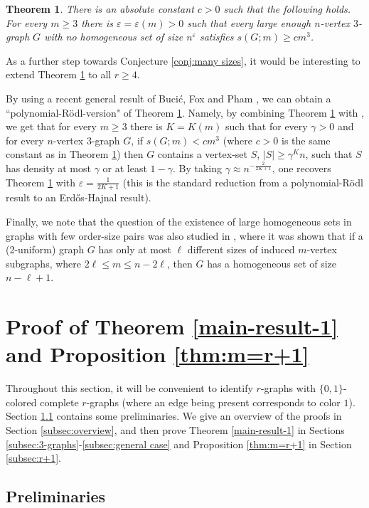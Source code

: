 \documentclass[11pt]{article}
\theoremstyle{plain}
\newtheorem{theorem}{Theorem}[section]
\begin{document}
\begin{theorem} \label{main-result-2}
    There is an absolute constant $c > 0$ such that the following holds. For every $m \geq 3$ there is $\varepsilon = \varepsilon(m) > 0$ such that every large enough $n$-vertex $3$-graph $G$ with no homogeneous set of size $n^\varepsilon$ satisfies $s(G;m) \geq cm^3$.
\end{theorem}
\noindent
As a further step towards Conjecture \ref{conj:many sizes}, it would be interesting to extend Theorem \ref{main-result-2} to all $r \geq 4$.

By using a recent general result of Buci\'c, Fox and Pham \cite{BFP}, we can obtain a ``polynomial-R\"odl-version" of Theorem \ref{main-result-2}. Namely, by combining Theorem \ref{main-result-2} with \cite[Theorem 19]{BFP}, we get that for every $m \geq 3$ there is $K = K(m)$ such that for every $\gamma > 0$ and for every $n$-vertex $3$-graph $G$, if $s(G;m) < cm^3$ (where $c > 0$ is the same constant as in Theorem \ref{main-result-2}) then $G$ contains a vertex-set $S$, $|S| \geq \gamma^K n$, such that $S$ has density at most $\gamma$ or at least $1-\gamma$. By taking $\gamma \approx n^{-\frac{2}{2K+1}}$, one recovers Theorem \ref{main-result-2} with $\varepsilon = \frac{1}{2K+1}$ (this is the standard reduction from a polynomial-R\"odl result to an Erd\H{o}s-Hajnal result). 


Finally, we note that the question of the existence of large homogeneous sets in graphs with few order-size pairs was also studied in \cite{AB}, where it was shown that if a (2-uniform) graph $G$ has only at most $\ell$ different sizes of induced $m$-vertex subgraphs, where $2\ell \leq m \leq n-2\ell$, then $G$ has a homogeneous set of size $n-\ell+1$. 


\section{Proof of Theorem \ref{main-result-1} and Proposition \ref{thm:m=r+1}}
Throughout this section, it will be convenient to identify $r$-graphs with $\{0,1\}$-colored complete $r$-graphs (where an edge being present corresponds to color $1$). Section \ref{subsec:prelim} contains some preliminaries. We give an overview of the proofs in Section \ref{subsec:overview}, and then prove Theorem \ref{main-result-1} in Sections \ref{subsec:3-graphs}-\ref{subsec:general case} and Proposition \ref{thm:m=r+1} in Section \ref{subsec:r+1}. 

\subsection{Preliminaries}\label{subsec:prelim}
\end{document}
